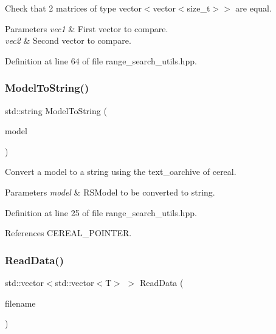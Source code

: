 Check that 2 matrices of type vector$<$vector$<$size\+\_\+t$>$$>$ are equal. 


\begin{DoxyParams}{Parameters}
{\em vec1} & First vector to compare. \\
\hline
{\em vec2} & Second vector to compare. \\
\hline
\end{DoxyParams}


Definition at line 64 of file range\+\_\+search\+\_\+utils.\+hpp.

\mbox{\label{range__search__utils_8hpp_a22e8b75c2153dee033c40446de6f9579}} 
\subsubsection{Model\+To\+String()}
{\footnotesize\ttfamily std\+::string Model\+To\+String (\begin{DoxyParamCaption}\item[{R\+S\+Model $\ast$}]{model }\end{DoxyParamCaption})\hspace{0.3cm}{\ttfamily [inline]}}



Convert a model to a string using the text\+\_\+oarchive of cereal. 


\begin{DoxyParams}{Parameters}
{\em model} & R\+S\+Model to be converted to string. \\
\hline
\end{DoxyParams}


Definition at line 25 of file range\+\_\+search\+\_\+utils.\+hpp.



References C\+E\+R\+E\+A\+L\+\_\+\+P\+O\+I\+N\+T\+ER.

\mbox{\label{range__search__utils_8hpp_af6f5b481a584d67f7621e7339fddc137}} 
\subsubsection{Read\+Data()}
{\footnotesize\ttfamily std\+::vector$<$std\+::vector$<$T$>$ $>$ Read\+Data (\begin{DoxyParamCaption}\item[{const std\+::string \&}]{filename }\end{DoxyParamCaption})}



